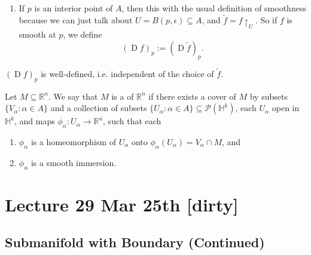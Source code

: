 \documentclass[notoc,notitlepage]{tufte-book}
\DeclareMathOperator{\D}{D}
\begin{document}
\begin{remark}
  \begin{enumerate}
    \item If $p$ is an interior point of $A$, then this  with
      the usual definition of smoothness because we can just talk about $U =
      B(p, \epsilon) \subseteq A$, and $\tilde{f} = f \restriction_{U}$. So if
      $f$ is smooth at $p$, we define
      \begin{equation*}
        (\D f)_p := (\D \tilde{f})_p.
      \end{equation*}
  \end{enumerate}
\end{remark}

\noindent
{} $(\D f)_p$ is well-defined, i.e. independent of the choice of
$\tilde{f}$.

\begin{defn}\label{defn:submanifold_with_boundary}
  Let $M \subseteq \mathbb{R}^n$. We say that $M$ is a  of $\mathbb{R}^n$ if there exists a cover of $M$ by
  subsets $\{ V_\alpha : \alpha \in A \}$ and a collection of subsets $\{
  U_\alpha : \alpha \in A \} \subseteq \mathcal{P}(\mathbb{H}^k)$, each
  $U_\alpha$ open in $\mathbb{H}^k$, and maps $\phi_\alpha : U_\alpha \to
  \mathbb{R}^n$, such that each
  \begin{enumerate}
    \item $\phi_\alpha$ is a homeomorphism of $U_\alpha$ onto
      $\phi_\alpha(U_\alpha) = V_\alpha \cap M$, and
    \item $\phi_\alpha$ is a smooth immersion.
  \end{enumerate}
\end{defn}



\chapter{Lecture 29 Mar 25th [dirty]}%
\label{chp:lecture_29_mar_25th}

\section{Submanifold with Boundary (Continued)}%
\label{sec:submanifold_with_boundary_continued}
\end{document}
